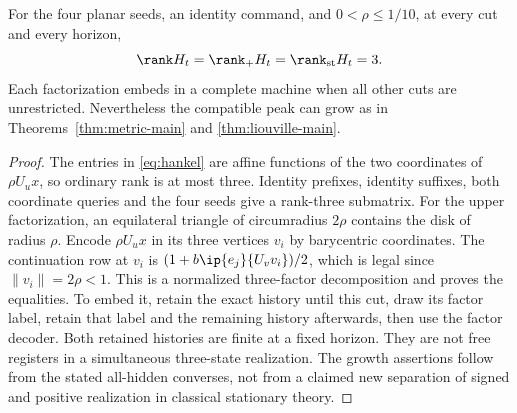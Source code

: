 \begin{proposition}\label{prop:rank-three44}
For the four planar seeds, an identity command, and $0<\rho\le1/10$,
at every cut and every horizon,
\begin{equation}\label{eq:three-ranks}
 \rank H_t=\rank_+H_t=\rank_{\mathrm{st}}H_t=3.
\end{equation}
Each factorization embeds in a complete machine when all other cuts
are unrestricted. Nevertheless the compatible peak can grow as in
Theorems~\ref{thm:metric-main} and \ref{thm:liouville-main}.
\end{proposition}
\begin{proof}
The entries in \eqref{eq:hankel} are affine functions of the two
coordinates of $\rho U_ux$, so ordinary rank is at most three. Identity
prefixes, identity suffixes, both coordinate queries and the four seeds
give a rank-three submatrix. For the upper factorization, an equilateral
triangle of circumradius $2\rho$ contains the disk of radius $\rho$.
Encode $\rho U_ux$ in its three vertices $v_i$ by barycentric coordinates.
The continuation row at $v_i$ is
$(1+b\ip{e_j}{U_vv_i})/2$, which is legal since $\|v_i\|=2\rho<1$.
This is a normalized three-factor decomposition and proves the equalities.
To embed it, retain the exact history until this cut, draw its factor
label, retain that label and the remaining history afterwards, then use
the factor decoder. Both retained histories are finite at a fixed
horizon. They are not free registers in a simultaneous three-state
realization. The growth assertions follow from the stated all-hidden
converses, not from a claimed new separation of signed and positive
realization in classical stationary theory.
\end{proof}

